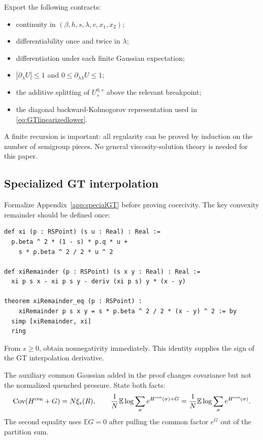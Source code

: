 \documentclass[11pt]{article}
\numberwithin{equation}{section}
\newcommand{\E}{\mathbb{E}}
\newcommand{\1}{\mathbf 1}
\begin{document}
Export the following contracts:
\begin{itemize}[leftmargin=2em]
\item continuity in $(\beta,h,s,\lambda,v,x_1,x_2)$;
\item differentiability once and twice in $\lambda$;
\item differentiation under each finite Gaussian expectation;
\item $|\partial_\lambda U|\le1$ and
      $0\le\partial_{\lambda\lambda}U\le1$;
\item the additive splitting of $U_s^{0,v}$ above the relevant breakpoint;
\item the diagonal backward-Kolmogorov representation used in
      \eqref{eq:GTlinearizedlower}.
\end{itemize}
A finite recursion is important: all regularity can be proved by induction on
the number of semigroup pieces.  No general viscosity-solution theory is
needed for this paper.

\subsection{Specialized GT interpolation}

Formalize Appendix~\ref{app:specialGT} before proving coercivity.  The key
convexity remainder should be defined once:
\begin{lstlisting}
def xi (p : RSPoint) (s u : Real) : Real :=
  p.beta ^ 2 * (1 - s) * p.q * u +
    s * p.beta ^ 2 / 2 * u ^ 2

def xiRemainder (p : RSPoint) (s x y : Real) : Real :=
  xi p s x - xi p s y - deriv (xi p s) y * (x - y)

theorem xiRemainder_eq (p : RSPoint) :
    xiRemainder p s x y = s * p.beta ^ 2 / 2 * (x - y) ^ 2 := by
  simp [xiRemainder, xi]
  ring
\end{lstlisting}
From $s\ge0$, obtain nonnegativity immediately.  This identity supplies the
sign of the GT interpolation derivative.

The auxiliary common Gaussian added in the proof changes covariance but not
the normalized quenched pressure.  State both facts:
\[
 \operatorname{Cov}(H^{\rm cen}+G)
 =N\xi_s(R),
 \qquad
 \frac1N\E\log\sum_\sigma e^{H^{\rm cen}(\sigma)+G}
 =
 \frac1N\E\log\sum_\sigma e^{H^{\rm cen}(\sigma)}.
\]
The second equality uses $\E G=0$ after pulling the common factor $e^G$ out
of the partition sum.
\end{document}
